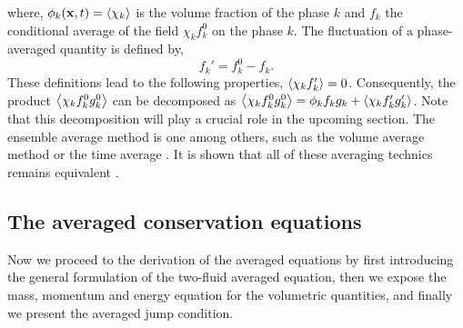 where, $\phi_k(\textbf{x},t) = \left<\chi_k\right>$ is the volume fraction of the phase $k$
and $f_k$ the conditional average of the field $\chi_k f_k^0$ on the phase $k$.
The fluctuation of a phase-averaged quantity is defined by,
\begin{equation}
    f_k' = f_k^0 - f_k.
    \label{eq:def_fluctu}
\end{equation}
These definitions lead to the following properties, $\left<\chi_k f'_k\right> = 0$. 
Consequently, the product $\left<\chi_k f^0_kg^0_k\right>$ can be decomposed as $\left<\chi_k f_k^0g_k^0\right>=\phi_k f_kg_k + \left<\chi_k f'_kg'_k\right>$. 
Note that this decomposition will play a crucial role in the upcoming section. 
The ensemble average method is one among others, such as the volume average method\citep{jackson1997locally} or the time average
\citep{ishii2010thermo}.
It is shown that all of these averaging technics remains equivalent \citep{jackson1997locally,zhang1997momentum}. 


\subsection{The averaged conservation equations}
Now we proceed to the derivation of the averaged equations by first introducing the general formulation of the two-fluid averaged equation, then we expose the mass, momentum and energy equation for the volumetric quantities, and finally we present the averaged jump condition. 

